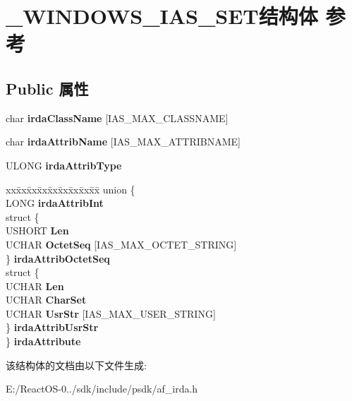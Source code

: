 \hypertarget{struct___w_i_n_d_o_w_s___i_a_s___s_e_t}{}\section{\+\_\+\+W\+I\+N\+D\+O\+W\+S\+\_\+\+I\+A\+S\+\_\+\+S\+E\+T结构体 参考}
\label{struct___w_i_n_d_o_w_s___i_a_s___s_e_t}
\subsection*{Public 属性}
\begin{DoxyCompactItemize}
\item 
\mbox{\label{struct___w_i_n_d_o_w_s___i_a_s___s_e_t_abfd710bc9a3b6634ed0f06f5bca1aa87}} 
char {\bfseries irda\+Class\+Name} \mbox{[}I\+A\+S\+\_\+\+M\+A\+X\+\_\+\+C\+L\+A\+S\+S\+N\+A\+ME\mbox{]}
\item 
\mbox{\label{struct___w_i_n_d_o_w_s___i_a_s___s_e_t_ae278762c4d56c5234af54cf06cdded97}} 
char {\bfseries irda\+Attrib\+Name} \mbox{[}I\+A\+S\+\_\+\+M\+A\+X\+\_\+\+A\+T\+T\+R\+I\+B\+N\+A\+ME\mbox{]}
\item 
\mbox{\label{struct___w_i_n_d_o_w_s___i_a_s___s_e_t_aa7c0f332efc2ed27131ed21c3f56c50b}} 
U\+L\+O\+NG {\bfseries irda\+Attrib\+Type}
\item 
\mbox{\label{struct___w_i_n_d_o_w_s___i_a_s___s_e_t_aecc729eacc7a87f9af9dee619d243f19}} 
\begin{tabbing}
xx\=xx\=xx\=xx\=xx\=xx\=xx\=xx\=xx\=\kill
union \{\\
\>LONG {\bfseries irdaAttribInt}\\
\>struct \{\\
\>\>USHORT {\bfseries Len}\\
\>\>UCHAR {\bfseries OctetSeq} \mbox{[}IAS\_MAX\_OCTET\_STRING\mbox{]}\\
\>\} {\bfseries irdaAttribOctetSeq}\\
\>struct \{\\
\>\>UCHAR {\bfseries Len}\\
\>\>UCHAR {\bfseries CharSet}\\
\>\>UCHAR {\bfseries UsrStr} \mbox{[}IAS\_MAX\_USER\_STRING\mbox{]}\\
\>\} {\bfseries irdaAttribUsrStr}\\
\} {\bfseries irdaAttribute}\\

\end{tabbing}\end{DoxyCompactItemize}


该结构体的文档由以下文件生成\+:\begin{DoxyCompactItemize}
\item 
E\+:/\+React\+O\+S-\/0../sdk/include/psdk/af\+\_\+irda.\+h\end{DoxyCompactItemize}
